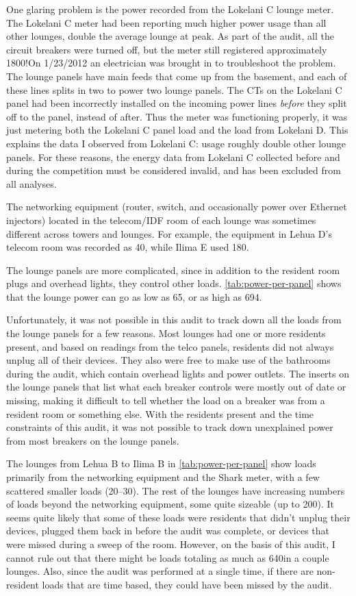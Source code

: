 \label{par:lokelani-c}
One glaring problem is the power recorded from the Lokelani C lounge meter. The Lokelani C meter had been reporting much higher power usage than all other lounges, double the average lounge at peak. As part of the audit, all the circuit breakers were turned off, but the meter still registered approximately 1800\W!\@ On 1/23/2012 an electrician was brought in to troubleshoot the problem. The lounge panels have main feeds that come up from the basement, and each of these lines splits in two to power two lounge panels. The CTs on the Lokelani C panel had been incorrectly installed on the incoming power lines \emph{before} they split off to the panel, instead of after. Thus the meter was functioning properly, it was just metering both the Lokelani C panel load and the load from Lokelani D. This explains the data I observed from Lokelani C: usage roughly double other lounge panels. For these reasons, the energy data from Lokelani C collected before and during the competition must be considered invalid, and has been excluded from all analyses.

The networking equipment (router, switch, and occasionally power over Ethernet injectors) located in the telecom/IDF room of each lounge was sometimes different across towers and lounges. For example, the equipment in Lehua D's telecom room was recorded as 40\W, while Ilima E used 180\W.

The lounge panels are more complicated, since in addition to the resident room plugs and overhead lights, they control other loads. \autoref{tab:power-per-panel} shows that the lounge power can go as low as 65\W, or as high as 694\W.

Unfortunately, it was not possible in this audit to track down all the loads from the lounge panels for a few reasons. Most lounges had one or more residents present, and based on readings from the telco panels, residents did not always unplug all of their devices. They also were free to make use of the bathrooms during the audit, which contain overhead lights and power outlets. The inserts on the lounge panels that list what each breaker controls were mostly out of date or missing, making it difficult to tell whether the load on a breaker was from a resident room or something else. With the residents present and the time constraints of this audit, it was not possible to track down unexplained power from most breakers on the lounge panels.

The lounges from Lehua B to Ilima B in \autoref{tab:power-per-panel} show loads primarily from the networking equipment and the Shark meter, with a few scattered smaller loads (20--30\W). The rest of the lounges have increasing numbers of loads beyond the networking equipment, some quite sizeable (up to 200\W). It seems quite likely that some of these loads were residents that didn't unplug their devices, plugged them back in before the audit was complete, or devices that were missed during a sweep of the room. However, on the basis of this audit, I cannot rule out that there might be loads totaling as much as 640\W in a couple lounges. Also, since the audit was performed at a single time, if there are non-resident loads that are time based, they could have been missed by the audit.

